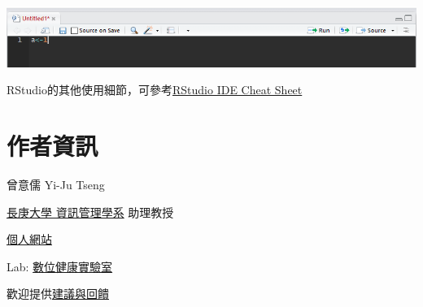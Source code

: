 \documentclass[]{book}
\theoremstyle{definition}
\theoremstyle{definition}
\theoremstyle{remark}
\begin{document}
\includegraphics[width=10.96in]{figure/ed}

RStudio的其他使用細節，可參考\href{https://www.rstudio.com/wp-content/uploads/2016/01/rstudio-IDE-cheatsheet.pdf}{RStudio
IDE Cheat Sheet}

\chapter*{作者資訊}\label{author}

曾意儒 Yi-Ju Tseng

\href{http://im.cgu.edu.tw/bin/home.php}{長庚大學 資訊管理學系} 助理教授

\href{http://yijutseng.github.io}{個人網站}

Lab: \href{https://dhlab-cgu.github.io/}{數位健康實驗室}

歡迎提供\href{https://goo.gl/forms/5Htobvwy2vsB7yiF3}{建議與回饋}


\end{document}

